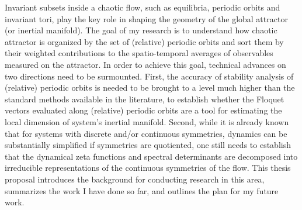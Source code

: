 
Invariant subsets inside a chaotic flow, such as equilibria, periodic
orbits and invariant tori, play the key role in shaping the geometry of
the global attractor (or inertial manifold). The goal of my research is
to understand how chaotic attractor is organized by the set of (relative)
periodic orbits and sort them by their weighted contributions to the
spatio-temporal averages of observables measured on the attractor. In
order to achieve this goal, technical advances on two directions need to be
surmounted. First, the accuracy of stability analysis of (relative)
periodic orbits is needed to be brought to a level much higher than the
standard methods available in the literature, to establish whether the
Floquet vectors evaluated along (relative) periodic orbits are a tool for
estimating the local dimension of system's inertial manifold. Second,
while it is already known that for systems with discrete and/or
continuous symmetries, dynamics can be substantially simplified if
symmetries are quotiented, one still needs to establish that the
dynamical zeta functions and spectral determinants 
are decomposed into irreducible representations of the continuous
symmetries of the flow. This thesis proposal introduces the background
for conducting research in this area, summarizes the work I have done so
far, and outlines the plan for my future work.
